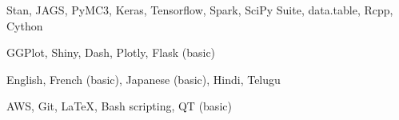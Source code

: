 

\begin{cvskills}


    {Stan, JAGS, PyMC3, Keras, Tensorflow, Spark, SciPy Suite, data.table, Rcpp, Cython}

    {GGPlot, Shiny, Dash, Plotly, Flask (basic)}

    {English, French (basic), Japanese (basic), Hindi, Telugu}

    {AWS, Git, LaTeX, Bash scripting, QT (basic)}


\end{cvskills}
